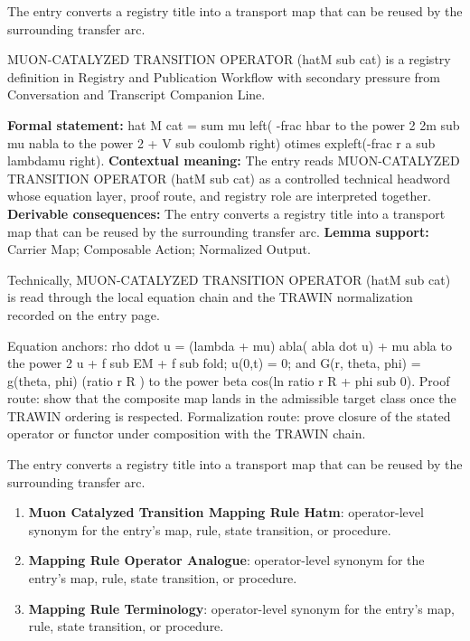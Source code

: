 The entry converts a registry title into a transport map that can be reused by the surrounding transfer arc.
\clearpage


\begingroup\small
{}
MUON-CATALYZED TRANSITION OPERATOR (hatM sub cat) is a registry definition in Registry and Publication Workflow with secondary pressure from Conversation and Transcript Companion Line.

\begingroup\footnotesize\setlength{\emergencystretch}{3em}\sloppy
\textbf{Formal statement:} hat M cat = sum mu left( -frac hbar to the power 2 2m sub mu nabla to the power 2 + V sub coulomb right) otimes expleft(-frac r a sub lambdamu right). \textbf{Contextual meaning:} The entry reads MUON-CATALYZED TRANSITION OPERATOR (hatM sub cat) as a controlled technical headword whose equation layer, proof route, and registry role are interpreted together. \textbf{Derivable consequences:} The entry converts a registry title into a transport map that can be reused by the surrounding transfer arc. \textbf{Lemma support:} Carrier Map; Composable Action; Normalized Output.\par
\endgroup

Technically, MUON-CATALYZED TRANSITION OPERATOR (hatM sub cat) is read through the local equation chain and the TRAWIN normalization recorded on the entry page.

Equation anchors: rho ddot u = (lambda + mu) abla( abla dot u) + mu abla to the power 2 u + f sub EM + f sub fold; u(0,t) = 0; and G(r, theta, phi) = g(theta, phi) (ratio r R ) to the power beta cos(ln ratio r R + phi sub 0). Proof route: show that the composite map lands in the admissible target class once the TRAWIN ordering is respected. Formalization route: prove closure of the stated operator or functor under composition with the TRAWIN chain.

The entry converts a registry title into a transport map that can be reused by the surrounding transfer arc.
\endgroup

\begin{enumerate}[leftmargin=1.6em,itemsep=6pt,topsep=4pt]
\item \textbf{Muon Catalyzed Transition Mapping Rule Hatm}: operator-level synonym for the entry's map, rule, state transition, or procedure.
\item \textbf{Mapping Rule Operator Analogue}: operator-level synonym for the entry's map, rule, state transition, or procedure.
\item \textbf{Mapping Rule Terminology}: operator-level synonym for the entry's map, rule, state transition, or procedure.
\end{enumerate}

